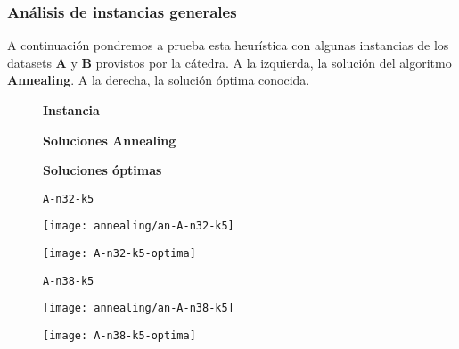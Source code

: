 \subsubsection{Análisis de instancias generales}
A continuación pondremos a prueba esta heurística con algunas instancias de los datasets \textbf{A} y \textbf{B} provistos por la cátedra. A la izquierda, la solución del algoritmo \textbf{Annealing}. A la derecha, la solución óptima conocida.

\begin{figure}[H]
	\begin{minipage}{0.15\textwidth}
		\centering
		\textbf{Instancia}
	\end{minipage}%
	\begin{minipage}{0.40\textwidth}
		\centering
		\textbf{Soluciones Annealing}
	\end{minipage}%
	\hspace{0.03\textwidth}
	\begin{minipage}{0.40\textwidth}
		\centering
		\textbf{Soluciones óptimas}
	\end{minipage}%

	\begin{minipage}{0.15\textwidth}
		\centering
		\texttt{A-n32-k5}
	\end{minipage}%
	\begin{minipage}{0.40\textwidth}
		\centering
		\texttt{[image: annealing/an-A-n32-k5]}\par
	\end{minipage}%
	\hspace{0.03\textwidth}
	\begin{minipage}{0.40\textwidth}
		\centering
		\texttt{[image: A-n32-k5-optima]}\par
	\end{minipage}%
\end{figure}

\begin{figure}[H]
	\begin{minipage}{0.15\textwidth}
		\centering
		\texttt{A-n38-k5}
	\end{minipage}%
	\begin{minipage}{0.40\textwidth}
		\centering
		\texttt{[image: annealing/an-A-n38-k5]}\par
	\end{minipage}%
	\hspace{0.03\textwidth}
	\begin{minipage}{0.40\textwidth}
		\centering
		\texttt{[image: A-n38-k5-optima]}\par
	\end{minipage}%
\end{figure}

